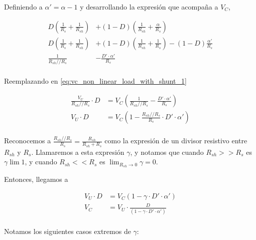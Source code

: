 Definiendo a $\alpha'=\alpha-1$ y desarrollando la expresión que acompaña a $V_C$,

\begin{equation}
    \begin{aligned}
        D \left( \frac{1}{R_s} + \frac{1}{R_{sh}} \right) &+ (1-D) \left(
        \frac{1}{R_{sh}} + \frac{\alpha}{R_s} \right) \\
        D \left( \frac{1}{R_s} + \frac{1}{R_{sh}} \right) &+ (1-D) \left(
        \frac{1}{R_{sh}} + \frac{1}{R_s} \right) - (1-D) \frac{\alpha'}{R_s} \\
        \frac{1}{R_{sh} // R_{s}} &- \frac{D' \cdot \alpha'}{R_s} \\
    \end{aligned}
\end{equation}

Reemplazando en \ref{eq:vc_non_linear_load_with_shunt_1}

\begin{equation}
    \label{eq:vc_non_linear_load_with_shunt_2}
    \begin{aligned}
        \frac{V_U}{R_{sh} // R_{s}} \cdot D &= V_C \left( \frac{1}{R_{sh} //
        R_{s}} - \frac{D' \cdot \alpha'}{R_s} \right) \\
        V_U \cdot D &= V_C \left( 1 - \frac{R_{sh} // R_{s}}{R_s} \cdot D' \cdot
        \alpha'\right) \\
    \end{aligned}
\end{equation}

Reconocemos a $\frac{R_{sh} // R_{s}}{R_s} = \frac{R_{sh}}{R_{sh}+R_s}$ como la
expresión de un divisor resistivo entre $R_{sh}$ y $R_s$. Llamaremos a esta
expresión $\gamma$, y notamos que cuando $R_{sh} >> R_s$ es $\gamma \lim 1$, y
cuando $R_{sh} << R_s$ es $\lim_{R_{sh} \to 0} \gamma = 0$.

Entonces, llegamos a

\begin{equation}
    \label{eq:vc_non_linear_load_with_shunt_final}
    \begin{aligned}
        V_U \cdot D &= V_C \left( 1 - \gamma \cdot D' \cdot \alpha'\right) \\
        V_C &= V_U \cdot \frac{D}{\left( 1 - \gamma \cdot D' \cdot \alpha'\right)} \\
    \end{aligned}
\end{equation}

Notamos los siguientes casos extremos de $\gamma$:

